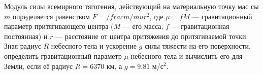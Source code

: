 Модуль силы всемирного тяготения, действующий на материальную точку мас
сы $m$ определяется равенством $F=/frac{m/mu}{r^2}$, где $\mu=fM$ --- 
гравитационный параметр притягивающего центра ($M$ --- его масса, $f$ 
--- гравитационная постоянная) и $r$ --- расстояние от центра притяжения 
до притягиваемой точки. Зная радиус $R$ небесного тела и ускорение $g$ 
силы тяжести на его поверхности, определить гравитационный параметр 
$\mu$ небесного тела и вычислить его для Земли, если её радиус $R=6370$
км, а $g=9.81$ м/с$^2$.
